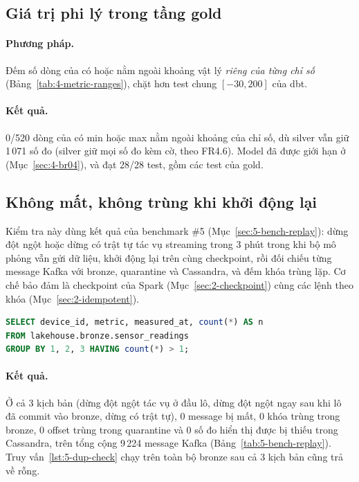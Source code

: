 \subsection{Giá trị phi lý trong tầng gold}
\label{sec:5-implausible}

\paragraph{Phương pháp.} Đếm số dòng của  có  hoặc  nằm ngoài khoảng vật lý \emph{riêng của từng chỉ số} (Bảng~\ref{tab:4-metric-ranges}), chặt hơn test  chung $[-30, 200]$ của dbt.

\paragraph{Kết quả.} 0/520 dòng của  có min hoặc max nằm ngoài khoảng của chỉ số, dù silver vẫn giữ 1\,071 số đo  (silver giữ mọi số đo kèm cờ, theo FR4.6). Model đã được giới hạn ở  (Mục~\ref{sec:4-br04}), và  đạt 28/28 test, gồm các test  của gold.

\subsection{Không mất, không trùng khi khởi động lại}
\label{sec:5-no-loss}

Kiểm tra này dùng kết quả của benchmark \#5 (Mục~\ref{sec:5-bench-replay}): dừng đột ngột hoặc dừng có trật tự tác vụ streaming trong 3 phút trong khi bộ mô phỏng vẫn gửi dữ liệu, khởi động lại trên cùng checkpoint, rồi đối chiếu từng message Kafka với bronze, quarantine và Cassandra, và đếm khóa  trùng lặp. Cơ chế bảo đảm là checkpoint của Spark (Mục~\ref{sec:2-checkpoint}) cùng các lệnh  theo khóa (Mục~\ref{sec:2-idempotent}).

\begin{lstlisting}[language=SQL, caption={Kiểm tra khóa trùng trong bronze}, label={lst:5-dup-check}]
SELECT device_id, metric, measured_at, count(*) AS n
FROM lakehouse.bronze.sensor_readings
GROUP BY 1, 2, 3 HAVING count(*) > 1;
\end{lstlisting}

\paragraph{Kết quả.} Ở cả 3 kịch bản (dừng đột ngột tác vụ ở đầu lô, dừng đột ngột ngay sau khi lô đã commit vào bronze, dừng có trật tự), 0 message bị mất, 0 khóa trùng trong bronze, 0 offset trùng trong quarantine và 0 số đo hiển thị được bị thiếu trong Cassandra, trên tổng cộng 9\,224 message Kafka (Bảng~\ref{tab:5-bench-replay}). Truy vấn~\ref{lst:5-dup-check} chạy trên toàn bộ bronze sau cả 3 kịch bản cũng trả về rỗng.

